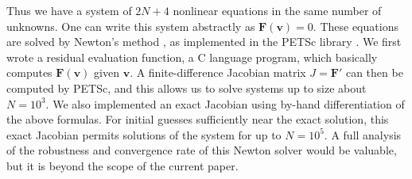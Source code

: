 \documentclass[review,letterpaper]{igs}
\begin{document}
Thus we have a system of $2N+4$ nonlinear equations in the same number of unknowns.  One can write this system abstractly as $\mathbf{F}(\mathbf{v})=0$.  These equations are solved by Newton's method \citep{Kelley}, as implemented in the PETSc library \citep{petsc-user-ref}.  We first wrote a residual evaluation function, a C language program, which basically computes $\mathbf{F}(\mathbf{v})$ given $\mathbf{v}$.  A finite-difference Jacobian matrix $J=\mathbf{F}'$ can then be computed by PETSc, and this allows us to solve systems up to size about $N=10^3$.  We also implemented an exact Jacobian using by-hand differentiation of the above formulas.  For initial guesses sufficiently near the exact solution, this exact Jacobian permits solutions of the system for up to $N=10^5$.  A full analysis of the robustness and convergence rate of this Newton solver would be valuable, but it is beyond the scope of the current paper.
\end{document}
